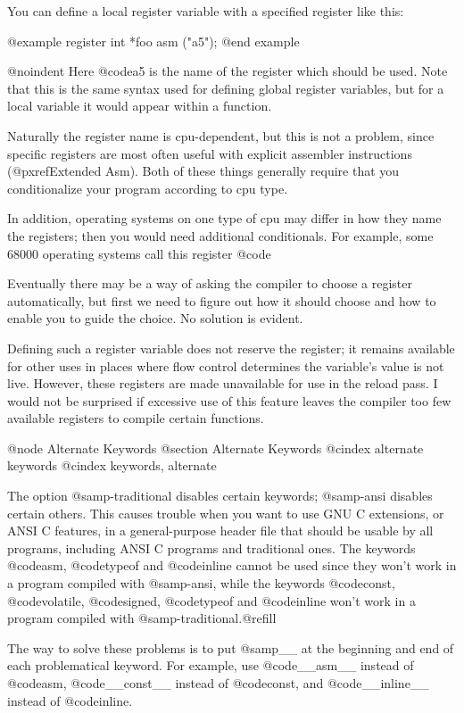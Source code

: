 {{{{You can define a local register variable with a specified register
like this:

@example
register int *foo asm ("a5");
@end example

@noindent
Here @code{a5} is the name of the register which should be used.  Note
that this is the same syntax used for defining global register
variables, but for a local variable it would appear within a function.

Naturally the register name is cpu-dependent, but this is not a
problem, since specific registers are most often useful with explicit
assembler instructions (@pxref{Extended Asm}).  Both of these things
generally require that you conditionalize your program according to
cpu type.

In addition, operating systems on one type of cpu may differ in how they
name the registers; then you would need additional conditionals.  For
example, some 68000 operating systems call this register @code{%

Eventually there may be a way of asking the compiler to choose a register
automatically, but first we need to figure out how it should choose and
how to enable you to guide the choice.  No solution is evident.

Defining such a register variable does not reserve the register; it
remains available for other uses in places where flow control determines
the variable's value is not live.  However, these registers are made
unavailable for use in the reload pass.  I would not be surprised if
excessive use of this feature leaves the compiler too few available
registers to compile certain functions.

@node Alternate Keywords
@section Alternate Keywords
@cindex alternate keywords
@cindex keywords, alternate

The option @samp{-traditional} disables certain keywords; @samp{-ansi}
disables certain others.  This causes trouble when you want to use GNU C
extensions, or ANSI C features, in a general-purpose header file that
should be usable by all programs, including ANSI C programs and traditional
ones.  The keywords @code{asm}, @code{typeof} and @code{inline} cannot be
used since they won't work in a program compiled with @samp{-ansi}, while
the keywords @code{const}, @code{volatile}, @code{signed}, @code{typeof}
and @code{inline} won't work in a program compiled with
@samp{-traditional}.@refill

The way to solve these problems is to put @samp{__} at the beginning and
end of each problematical keyword.  For example, use @code{__asm__}
instead of @code{asm}, @code{__const__} instead of @code{const}, and
@code{__inline__} instead of @code{inline}.

}}}}}
